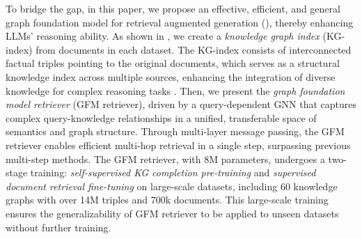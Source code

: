 
To bridge the gap, in this paper, we propose an effective, efficient, and general graph foundation model for retrieval augmented generation (\ourmethod), thereby enhancing LLMs' reasoning ability.
%
As shown in , we create a \emph{knowledge graph index} (KG-index) from documents in each dataset. The KG-index consists of interconnected factual triples pointing to the original documents, which serves as a structural knowledge index across multiple sources, enhancing the integration of diverse knowledge for complex reasoning tasks \citep{gutiérrez2024hipporag}. 
%
Then, we present the \emph{graph foundation model retriever} (GFM retriever), driven by a query-dependent GNN that captures complex query-knowledge relationships in a unified,  transferable space of semantics and graph structure. Through multi-layer message passing, the GFM retriever enables efficient multi-hop retrieval in a single step, surpassing previous multi-step methods.
%
The GFM retriever, with 8M parameters, undergoes a two-stage training: \emph{self-supervised KG completion pre-training} and \emph{supervised document retrieval fine-tuning} on large-scale datasets, including 60 knowledge graphs with over 14M triples and 700k documents. This large-scale training ensures the generalizability of GFM retriever to be applied to unseen datasets without further training.

